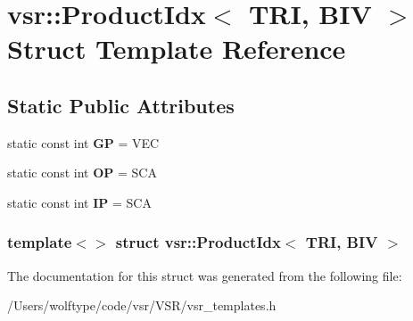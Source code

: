 \hypertarget{structvsr_1_1_product_idx_3_01_t_r_i_00_01_b_i_v_01_4}{\section{vsr\-:\-:Product\-Idx$<$ T\-R\-I, B\-I\-V $>$ Struct Template Reference}
\label{structvsr_1_1_product_idx_3_01_t_r_i_00_01_b_i_v_01_4}
}
\subsection*{Static Public Attributes}
\begin{DoxyCompactItemize}
\item 
\hypertarget{structvsr_1_1_product_idx_3_01_t_r_i_00_01_b_i_v_01_4_aac1928450c012ab4623fe5fd0eb8f4b1}{static const int {\bfseries G\-P} = V\-E\-C}\label{structvsr_1_1_product_idx_3_01_t_r_i_00_01_b_i_v_01_4_aac1928450c012ab4623fe5fd0eb8f4b1}

\item 
\hypertarget{structvsr_1_1_product_idx_3_01_t_r_i_00_01_b_i_v_01_4_ac19d9c8b031d938a4fd0fb475eec40fe}{static const int {\bfseries O\-P} = S\-C\-A}\label{structvsr_1_1_product_idx_3_01_t_r_i_00_01_b_i_v_01_4_ac19d9c8b031d938a4fd0fb475eec40fe}

\item 
\hypertarget{structvsr_1_1_product_idx_3_01_t_r_i_00_01_b_i_v_01_4_a021963a4331d8aab76b14857b007ec1e}{static const int {\bfseries I\-P} = S\-C\-A}\label{structvsr_1_1_product_idx_3_01_t_r_i_00_01_b_i_v_01_4_a021963a4331d8aab76b14857b007ec1e}

\end{DoxyCompactItemize}
\subsubsection*{template$<$$>$ struct vsr\-::\-Product\-Idx$<$ T\-R\-I, B\-I\-V $>$}



The documentation for this struct was generated from the following file\-:\begin{DoxyCompactItemize}
\item 
/\-Users/wolftype/code/vsr/\-V\-S\-R/vsr\-\_\-templates.\-h\end{DoxyCompactItemize}
